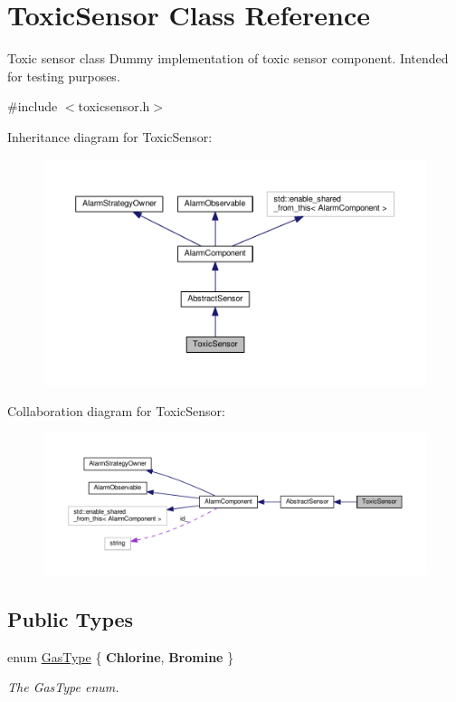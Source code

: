 \hypertarget{classToxicSensor}{}\section{Toxic\+Sensor Class Reference}
\label{classToxicSensor}


Toxic sensor class Dummy implementation of toxic sensor component. Intended for testing purposes.  




{\ttfamily \#include $<$toxicsensor.\+h$>$}



Inheritance diagram for Toxic\+Sensor\+:\nopagebreak
\begin{figure}[H]
\begin{center}
\leavevmode
\includegraphics[width=350pt]{classToxicSensor__inherit__graph}
\end{center}
\end{figure}


Collaboration diagram for Toxic\+Sensor\+:\nopagebreak
\begin{figure}[H]
\begin{center}
\leavevmode
\includegraphics[width=350pt]{classToxicSensor__coll__graph}
\end{center}
\end{figure}
\subsection*{Public Types}
\begin{DoxyCompactItemize}
\item 
enum \hyperlink{classToxicSensor_a140f14965ad9a7e71fc8a5a2ed2c919b}{Gas\+Type} \{ {\bfseries Chlorine}, 
{\bfseries Bromine}
 \}\begin{DoxyCompactList}\small\item\em The Gas\+Type enum. \end{DoxyCompactList}
\end{DoxyCompactItemize}

